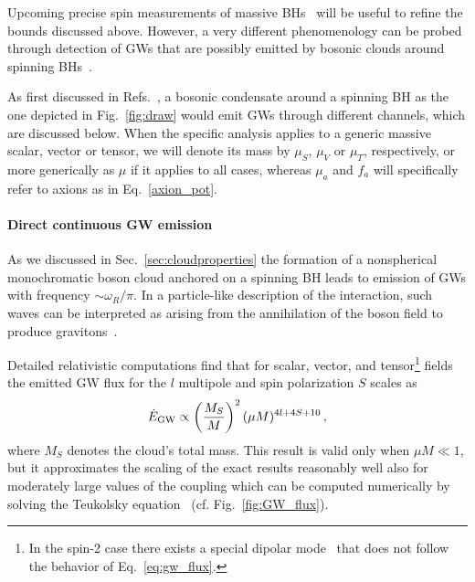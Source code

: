 \documentclass[11pt]{article}
\numberwithin{equation}{section} %
\begin{document}
Upcoming precise spin measurements of massive BHs~\cite{GRAVITY,Lu:2014zja,Brito:2017zvb} will be useful to refine the 
bounds discussed above. However, a very different phenomenology can be probed through detection of GWs that are possibly 
emitted by bosonic clouds around spinning 
BHs~\cite{Arvanitaki:2009fg,Arvanitaki:2010sy,Yoshino:2013ofa,Brito:2014wla,Arvanitaki:2014wva,Yoshino:2014wwa,
Arvanitaki:2016qwi,Baryakhtar:2017ngi,East:2017mrj,Brito:2017zvb,Brito:2017wnc,Isi:2018pzk,Ghosh:2018gaw,East:2018glu,
Siemonsen:2019ebd,Ng:2020jqd}. 


As first discussed in Refs.~\cite{Arvanitaki:2009fg,Arvanitaki:2010sy,Yoshino:2012kn,Arvanitaki:2014wva}, a bosonic condensate around a spinning BH as the one depicted in Fig.~\ref{fig:draw} would emit GWs through different channels, which are discussed below. When the specific analysis applies to a generic massive scalar, vector or tensor, we will denote its mass by $\mu_S$, $\mu_V$ or $\mu_T$, respectively, or more generically as $\mu$ if it applies to all cases, whereas $\mu_a$ and $f_a$ will specifically refer to axions as in Eq.~\eqref{axion_pot}.  

\paragraph{Direct continuous GW emission}
As we discussed in Sec.~\ref{sec:cloudproperties} the formation of a nonspherical monochromatic boson cloud anchored on a spinning BH leads to emission of GWs with frequency $\sim \omega_R/\pi$. In a particle-like description of the interaction, such waves can be interpreted as arising from the annihilation of the boson field to produce gravitons~\cite{Arvanitaki:2010sy}. 

Detailed relativistic computations find that for scalar, vector, and tensor\footnote{In the spin-2 case there 
exists a special dipolar mode~\cite{Brito:2013wya} that does not follow the behavior of Eq.~\eqref{eq:gw_flux}.} fields 
the emitted GW flux for the $l$ multipole and spin polarization $S$ scales 
as~\cite{Yoshino:2013ofa,Brito:2014wla,Ficarra:2018rfu,Baryakhtar:2017ngi,Brito:2020lup}
\begin{equation}\label{eq:gw_flux}
 \dot{E}_{\rm GW}\propto \left(\frac{M_S}{M}\right)^2 (\mu M)^{4l+4S+10}\,,
\end{equation}
where $M_S$ denotes the cloud's total mass.
This result is valid only when $\mu M\ll1$, but it approximates the scaling of the exact results reasonably well also for moderately large values of the coupling which can be computed numerically by solving the Teukolsky equation~\cite{Yoshino:2013ofa,Brito:2017zvb,Siemonsen:2019ebd} (cf. Fig.~\ref{fig:GW_flux}). 
\end{document}
